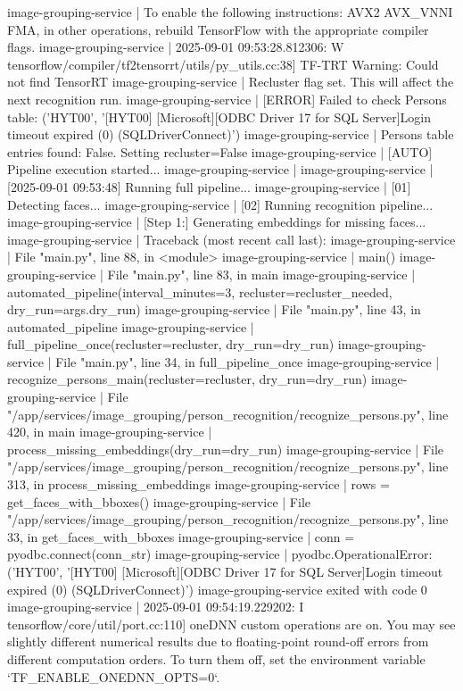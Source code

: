 image-grouping-service  | To enable the following instructions: AVX2 AVX_VNNI FMA, in other operations, rebuild TensorFlow with the appropriate compiler flags.
image-grouping-service  | 2025-09-01 09:53:28.812306: W tensorflow/compiler/tf2tensorrt/utils/py_utils.cc:38] TF-TRT Warning: Could not find TensorRT
image-grouping-service  | Recluster flag set. This will affect the next recognition run.
image-grouping-service  | [ERROR] Failed to check Persons table: ('HYT00', '[HYT00] [Microsoft][ODBC Driver 17 for SQL Server]Login timeout expired (0) (SQLDriverConnect)')
image-grouping-service  | Persons table entries found: False. Setting recluster=False
image-grouping-service  | [AUTO] Pipeline execution started...
image-grouping-service  |
image-grouping-service  | [2025-09-01 09:53:48] Running full pipeline...
image-grouping-service  | [01] Detecting faces...
image-grouping-service  | [02] Running recognition pipeline...
image-grouping-service  | [Step 1:] Generating embeddings for missing faces...
image-grouping-service  | Traceback (most recent call last):
image-grouping-service  |   File "main.py", line 88, in <module>
image-grouping-service  |     main()
image-grouping-service  |   File "main.py", line 83, in main
image-grouping-service  |     automated_pipeline(interval_minutes=3, recluster=recluster_needed, dry_run=args.dry_run)
image-grouping-service  |   File "main.py", line 43, in automated_pipeline
image-grouping-service  |     full_pipeline_once(recluster=recluster, dry_run=dry_run)
image-grouping-service  |   File "main.py", line 34, in full_pipeline_once
image-grouping-service  |     recognize_persons_main(recluster=recluster, dry_run=dry_run)
image-grouping-service  |   File "/app/services/image_grouping/person_recognition/recognize_persons.py", line 420, in main
image-grouping-service  |     process_missing_embeddings(dry_run=dry_run)
image-grouping-service  |   File "/app/services/image_grouping/person_recognition/recognize_persons.py", line 313, in process_missing_embeddings
image-grouping-service  |     rows = get_faces_with_bboxes()
image-grouping-service  |   File "/app/services/image_grouping/person_recognition/recognize_persons.py", line 33, in get_faces_with_bboxes
image-grouping-service  |     conn = pyodbc.connect(conn_str)
image-grouping-service  | pyodbc.OperationalError: ('HYT00', '[HYT00] [Microsoft][ODBC Driver 17 for SQL Server]Login timeout expired (0) (SQLDriverConnect)')
image-grouping-service exited with code 0
image-grouping-service  | 2025-09-01 09:54:19.229202: I tensorflow/core/util/port.cc:110] oneDNN custom operations are on. You may see slightly different numerical results due to floating-point round-off errors from different computation orders. To turn them off, set the environment variable `TF_ENABLE_ONEDNN_OPTS=0`.
